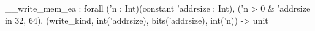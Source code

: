 __write_mem_ea : forall ('n : Int)(constant 'addrsize : Int), ('n > 0 & 'addrsize in {32, 64}).
  (write_kind, int('addrsize), bits('addrsize), int('n)) -> unit